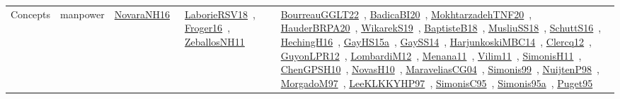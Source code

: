 {\begin{longtable}{lp{3cm}>{\raggedright\arraybackslash}p{6cm}>{\raggedright\arraybackslash}p{6cm}>{\raggedright\arraybackslash}p{8cm}}
Concepts & manpower & \href{../works/NovaraNH16.pdf}{NovaraNH16}~\cite{NovaraNH16} & \href{../works/LaborieRSV18.pdf}{LaborieRSV18}~\cite{LaborieRSV18}, \href{../works/Froger16.pdf}{Froger16}~\cite{Froger16}, \href{../works/ZeballosNH11.pdf}{ZeballosNH11}~\cite{ZeballosNH11} & \href{../works/BourreauGGLT22.pdf}{BourreauGGLT22}~\cite{BourreauGGLT22}, \href{../works/BadicaBI20.pdf}{BadicaBI20}~\cite{BadicaBI20}, \href{../works/MokhtarzadehTNF20.pdf}{MokhtarzadehTNF20}~\cite{MokhtarzadehTNF20}, \href{../works/HauderBRPA20.pdf}{HauderBRPA20}~\cite{HauderBRPA20}, \href{../works/WikarekS19.pdf}{WikarekS19}~\cite{WikarekS19}, \href{../works/BaptisteB18.pdf}{BaptisteB18}~\cite{BaptisteB18}, \href{../works/MusliuSS18.pdf}{MusliuSS18}~\cite{MusliuSS18}, \href{../works/SchuttS16.pdf}{SchuttS16}~\cite{SchuttS16}, \href{../works/HechingH16.pdf}{HechingH16}~\cite{HechingH16}, \href{../works/GayHS15a.pdf}{GayHS15a}~\cite{GayHS15a}, \href{../works/GaySS14.pdf}{GaySS14}~\cite{GaySS14}, \href{../works/HarjunkoskiMBC14.pdf}{HarjunkoskiMBC14}~\cite{HarjunkoskiMBC14}, \href{../works/Clercq12.pdf}{Clercq12}~\cite{Clercq12}, \href{../works/GuyonLPR12.pdf}{GuyonLPR12}~\cite{GuyonLPR12}, \href{../works/LombardiM12.pdf}{LombardiM12}~\cite{LombardiM12}, \href{../works/Menana11.pdf}{Menana11}~\cite{Menana11}, \href{../works/Vilim11.pdf}{Vilim11}~\cite{Vilim11}, \href{../works/SimonisH11.pdf}{SimonisH11}~\cite{SimonisH11}, \href{../works/ChenGPSH10.pdf}{ChenGPSH10}~\cite{ChenGPSH10}, \href{../works/NovasH10.pdf}{NovasH10}~\cite{NovasH10}, \href{../works/MaraveliasCG04.pdf}{MaraveliasCG04}~\cite{MaraveliasCG04}, \href{../works/Simonis99.pdf}{Simonis99}~\cite{Simonis99}, \href{../works/NuijtenP98.pdf}{NuijtenP98}~\cite{NuijtenP98}, \href{../works/MorgadoM97.pdf}{MorgadoM97}~\cite{MorgadoM97}, \href{../works/LeeKLKKYHP97.pdf}{LeeKLKKYHP97}~\cite{LeeKLKKYHP97}, \href{../works/SimonisC95.pdf}{SimonisC95}~\cite{SimonisC95}, \href{../works/Simonis95a.pdf}{Simonis95a}~\cite{Simonis95a}, \href{../works/Puget95.pdf}{Puget95}~\cite{Puget95}\\

\end{longtable}}
